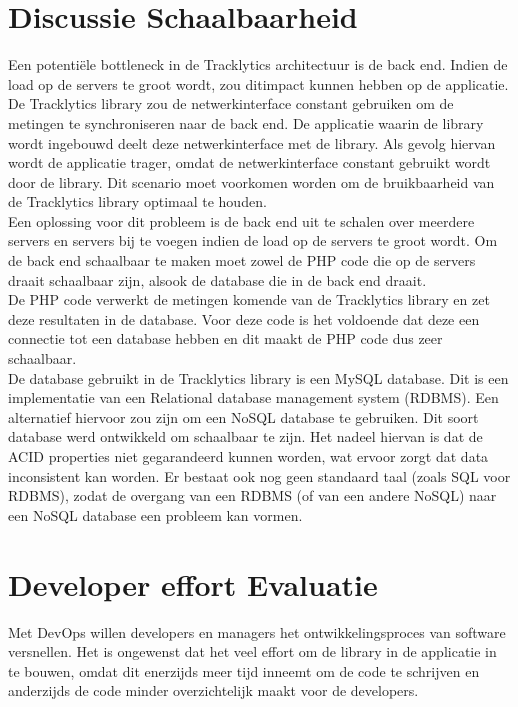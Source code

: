 \section{Discussie Schaalbaarheid} \label{schaalbaarheid}
Een potenti\"ele bottleneck in de Tracklytics architectuur is de back end. Indien de load op de servers te groot wordt, zou ditimpact kunnen hebben op de applicatie. De Tracklytics library zou de netwerkinterface constant gebruiken om de metingen te synchroniseren naar de back end. De applicatie waarin de library wordt ingebouwd deelt deze netwerkinterface met de library. Als gevolg hiervan wordt de applicatie trager, omdat de netwerkinterface constant gebruikt wordt door de library. Dit scenario moet voorkomen worden om de bruikbaarheid van de Tracklytics library optimaal te houden.\\

Een oplossing voor dit probleem is de back end uit te schalen over meerdere servers en servers bij te voegen indien de load op de servers te groot wordt. Om de back end schaalbaar te maken moet zowel de PHP code die op de servers draait schaalbaar zijn, alsook de database die in de back end draait. \\

De PHP code verwerkt de metingen komende van de Tracklytics library en zet deze resultaten in de database. Voor deze code is het voldoende dat deze een connectie tot een database hebben en dit maakt de PHP code dus zeer schaalbaar.\\

De database gebruikt in de Tracklytics library is een MySQL database. Dit is een implementatie van een Relational database management system (RDBMS). Een alternatief hiervoor zou zijn om een NoSQL database te gebruiken. Dit soort database werd ontwikkeld om schaalbaar te zijn. Het nadeel hiervan is dat de ACID properties niet gegarandeerd kunnen worden, wat ervoor zorgt dat data inconsistent kan worden. Er bestaat ook nog geen standaard taal (zoals SQL voor RDBMS), zodat de overgang van een RDBMS (of van een andere NoSQL) naar een NoSQL database een probleem kan vormen. \\


\section{Developer effort Evaluatie}\label{Section:Effort}
Met DevOps willen developers en managers het ontwikkelingsproces van software versnellen. Het is ongewenst dat het veel effort om de library in de applicatie in te bouwen, omdat dit enerzijds meer tijd inneemt om de code te schrijven en anderzijds de code minder overzichtelijk maakt voor de developers. \\

